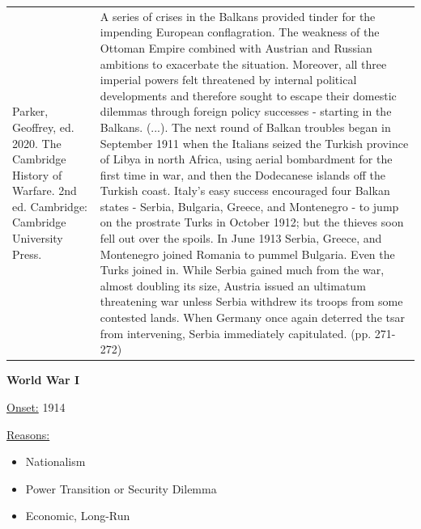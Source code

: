 {\begin{longtable}{p{}p{}}
\\
Parker, Geoffrey, ed. 2020. The Cambridge History of Warfare. 2nd ed. Cambridge: Cambridge University Press. & A series of crises in the Balkans provided tinder for the impending European conflagration. The weakness of the Ottoman Empire combined with Austrian and Russian ambitions to exacerbate the situation. Moreover, all three imperial powers felt threatened by internal political developments and therefore sought to escape their domestic dilemmas through foreign policy successes - starting in the Balkans. (...). 
The next round of Balkan troubles began in September 1911 when the Italians seized the Turkish province of Libya in north Africa, using aerial bombardment for the first time in war, and then the Dodecanese islands off the Turkish coast. Italy's easy success encouraged four Balkan states - Serbia, Bulgaria, Greece, and Montenegro - to jump on the prostrate Turks in October 1912; but the thieves soon fell out over the spoils. In June 1913 Serbia, Greece, and Montenegro joined Romania to pummel Bulgaria. Even the Turks joined in. While Serbia gained much from the war, almost doubling its size, Austria issued an ultimatum threatening war unless Serbia withdrew its troops from some contested lands. When Germany once again deterred the tsar from intervening, Serbia immediately capitulated. (pp. 271-272)
\\
\end{longtable}}
\clearpage
         \textbf{World War I} 

          \underline{Onset:} 1914         

\underline{Reasons:}
\begin{itemize}
\item Nationalism
\item Power Transition or Security Dilemma
\item Economic, Long-Run
\end{itemize}

